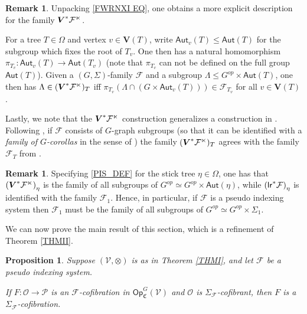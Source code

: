 \documentclass[a4paper,10pt
,draft
]{article}%
\numberwithin{equation}{section}
\numberwithin{figure}{section}
\newtheorem{proposition}[equation]{Proposition}%
\theoremstyle{definition} %
\newtheorem{remark}[equation]{Remark}%
\newcommand{\Op}{\mathsf{Op}}%
\newcommand{\F}{\ensuremath{\mathcal F}}
\newcommand{\V}{\ensuremath{\mathcal V}}
\renewcommand{\O}{\ensuremath{\mathcal O}}
\renewcommand{\P}{\ensuremath{\mathcal P}}
\newcommand{\1}{\ensuremath{\mathbbm 1}}%
\begin{document}
\begin{remark}
	Unpacking \eqref{FWRNXI EQ}, one obtains a more 
	explicit description for the family
	$\boldsymbol{V}^{\**}\F^\ltimes$.

	For a tree $T \in \Omega$
	and vertex $v \in \boldsymbol{V}(T)$, write 
	$\mathsf{Aut}_{v}(T) \leq \mathsf{Aut}(T)$ for the subgroup which fixes the root of $T_v$.
	One then has a natural homomorphism
	$\pi_{T_v} \colon \mathsf{Aut}_v(T) \to \mathsf{Aut}(T_v)$
	(note that $\pi_{T_v}$ can not be defined on the full group
	$\mathsf{Aut}(T)$).
%
	Given a $(G,\Sigma)$-family $\F$ and a subgroup $\Lambda \leq G^{op} \times \mathsf{Aut}(T)$,
	one then has
	$\Lambda \in (\boldsymbol{V}^{\**}\F^\ltimes)_T$ iff
	$\pi_{T_v}\left( \Lambda \cap (G \times \mathsf{Aut}_{v}(T)) \right) \in \F_{T_v}$
	for all $v \in \boldsymbol{V}(T)$.

	Lastly, we note that the $\boldsymbol{V}^{\**}\F^\ltimes$
	construction generalizes a construction in
	\cite{BP_geo}.
	Following \cite[Rem. 6.48]{BP_geo}, 
	if $\F$ consists of $G$-graph subgroups
	(so that it can be identified with a 
	\textit{family of $G$-corollas} in the sense of \cite[Def. 4.53]{BP_geo})
	the family $(\boldsymbol{V}^{\**}\F^\ltimes)_T$ agrees
	with the family $\F_T$ from \cite[Prop. 6.46]{BP_geo}.
\end{remark}


\begin{remark}\label{PSEUSTI REM}
	Specifying \eqref{PIS_DEF}
	for the stick tree $\eta \in \Omega$,
	one has that 
$
\left(\boldsymbol{V}^{\**} \mathcal{F}^{\ltimes}\right)_{\eta}
$
	is the family of all subgroups of
	$G^{op} \simeq G^{op} \times \mathsf{\mathsf{Aut}}(\eta)$,
	while
$
\left(\mathsf{lr}^{\**} \mathcal{F}\right)_{\eta}
$
is identified with the family 
$\F_1$.
Hence, in particular, if $\F$ is a pseudo indexing system then
$\F_1$ must be the family of all subgroups of
$G^{op} \simeq G^{op} \times \Sigma_1$.
\end{remark}



We can now prove the main result of this section, which is a refinement of Theorem
\ref{THMII}.

	
	
\begin{proposition}\label{SIGMAG_COF PROP}
	Suppose $(\V, \otimes)$ is as in Theorem \ref{THMI},
	and let $\F$ be a pseudo indexing system.
      
	If $F \colon \O \to \P$ is an $\F$-cofibration in $\Op^G_{\mathfrak C}(\V)$ and $\O$ is $\Sigma_\F$-cofibrant,
	then $F$ is a $\Sigma_\F$-cofibration.
\end{proposition}
\end{document}
